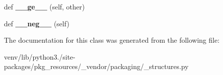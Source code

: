 \begin{DoxyCompactItemize}
\item 
\mbox{\label{classpkg__resources_1_1__vendor_1_1packaging_1_1__structures_1_1_negative_infinity_a019a402ad5189cb840d5067fb9703276}} 
def {\bfseries \+\_\+\+\_\+ge\+\_\+\+\_\+} (self, other)
\item 
\mbox{\label{classpkg__resources_1_1__vendor_1_1packaging_1_1__structures_1_1_negative_infinity_a0d1ed8fab251e18cadd8b045de95ec15}} 
def {\bfseries \+\_\+\+\_\+neg\+\_\+\+\_\+} (self)
\end{DoxyCompactItemize}


The documentation for this class was generated from the following file\+:\begin{DoxyCompactItemize}
\item 
venv/lib/python3./site-\/packages/pkg\+\_\+resources/\+\_\+vendor/packaging/\+\_\+structures.\+py\end{DoxyCompactItemize}
